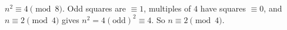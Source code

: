 $n^2\equiv4\pmod8$. Odd squares are $\equiv1$, multiples of $4$ have squares $\equiv0$, and $n\equiv2\pmod4$ gives $n^2=4(\text{odd})^2\equiv4$. So $\boxed{n\equiv2\pmod4}$.
